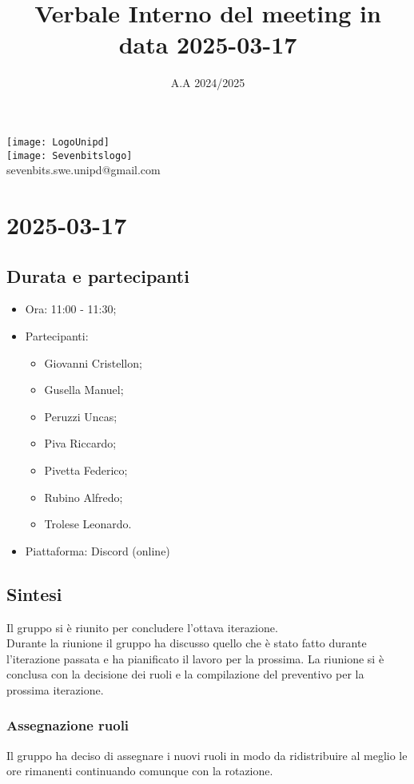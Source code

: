\documentclass[10pt]{article}
\title{Verbale Interno del meeting in data 2025-03-17}
\date{A.A 2024/2025}
\begin{document}
\maketitle
\begin{center}
\texttt{[image: LogoUnipd]}\\
\texttt{[image: Sevenbitslogo]}\\
sevenbits.swe.unipd@gmail.com\\
\vspace{2mm}
\end{center}
\newpage
\tableofcontents
\newpage
\section{2025-03-17}
\subsection{Durata e partecipanti}
\begin{itemize}
\item Ora: 11:00 - 11:30;
\item Partecipanti:
	\begin{itemize}
    \item Giovanni Cristellon;
		\item Gusella Manuel;
		\item Peruzzi Uncas;
		\item Piva Riccardo;
		\item Pivetta Federico;
		\item Rubino Alfredo;
		\item Trolese Leonardo.
	\end{itemize}
\item Piattaforma: Discord (online)
\end{itemize}

\subsection{Sintesi}
Il gruppo si è riunito per concludere l'ottava iterazione.\\
Durante la riunione il gruppo ha discusso quello che è stato fatto durante l'iterazione passata e ha pianificato il lavoro per la prossima. La riunione si è conclusa con la decisione dei ruoli e la compilazione del preventivo per la prossima iterazione.

\subsubsection{Assegnazione ruoli}
Il gruppo ha deciso di assegnare i nuovi ruoli in modo da ridistribuire al meglio le ore rimanenti continuando comunque con la rotazione.
\end{document}
